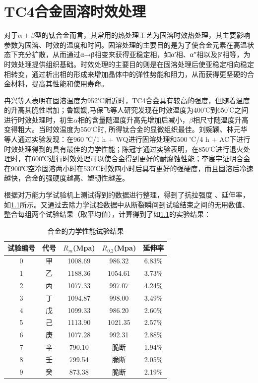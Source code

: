 \chapter{TC4合金固溶时效处理}

对于$\alpha+\beta$型的\ti 钛合金而言，其常用的热处理工艺为固溶时效热处理，其主要影响参数为固溶、时效的温度和时间\cite{mirror1,ranxingGurongwenduduiTi6Al4VELItaihejinxianweizuzhijixingnengdeyingxiang2021}。固溶处理的主要目的是为了使合金元素在高温状态下充分扩散，从而通过α→β相变来获得亚稳定相，如α′相、α′′相以及β′相等，为时效处理提供组织基础。时效处理的主要目的则是在固溶处理后使亚稳定相向稳定相转变，通过析出相的形成来增加晶体中的弹性势能和阻力，从而获得更坚硬的合金材料，提高其性能和使用寿命。


冉兴等人表明\cite{ranxingGurongwenduduiTi6Al4VELItaihejinxianweizuzhijixingnengdeyingxiang2021}在固溶温度为952℃附近时，TC4合金具有较高的强度，但随着温度的升高其脆性增加；鲁媛媛,马保飞等人研究发现在时效温度为400℃到650℃之间进行时效处理时，初生$ \alpha $相的含量随温度升高先增加后减小，$\beta$相尺寸随温度升高变得粗大。当时效温度为550℃时, 所得钛合金的显微组织最佳\cite{luyuanyuanShixiaochuliduiTC4taihejinweiguanzuzhihelixuexingnengdeyingxiang2019}。刘婉颖、林元华等人通过实验发现：在960 ℃/1 h + WQ进行固溶处理和500 ℃/4 h + AC下进行时效处理得到的\ti 具有最佳的力学性能\cite{LiuWanYingBuTongReChuLiGongYiDuiTi6Al4VTaiHeJinWeiGuanJieGouHeLiXueXingNengYingXiangYingWen2017}；陈冠宇通过实验表明，在850℃进行退火处理时，在600℃进行时效处理可以使合金得到更好的耐腐蚀性能\cite{1200}；李宸宇证明\ti 合金在900℃空冷固溶两小时在530℃时效四小时后具有更好的强硬度，而且固溶后冷速越快，合金的强硬度越高、塑韧性越差\cite{900}。%

根据对万能力学试验机上测试得到的数据进行整理，得到了抗拉强度%
、延伸率，如\ref{sec:mystrength}所示。又通过去除力学试验数据中从断裂瞬间到试验结束之间的无用数值、整合每组两个试验结果（取平均值），计算得到了如\ref{sec:mystrength}的实验结果：
\begin{table}[htbp]
	\centering
	\caption{\ti 合金的力学性能试验结果}
	\label{sec:mystrength}
	\begin{tabular}{ccccc}
		\toprule
		试验编号& 代号&$ R_m $(Mpa)&$ R_0.2 $(Mpa)&延伸率 \\
		\midrule
		0 & 甲 & 1008.69 &986.32& 6.83$\%$ \\
		1 & 乙 & 1188.36 &1054.61 &3.73$\%$ \\
		2 & 丙 & 1077.33 & 997.07&4.24$\%$ \\
		3 & 丁 & 1094.87 & 998.00&3.49$\%$ \\
		4 & 戊 & 1099.33 &986.20 &2.60$\%$ \\
		5 & 己 & 1113.90 & 1021.35&2.57$\%$ \\
		6 & 庚 & 1077.28 &992.31& 2.88$\%$ \\
		7 & 辛 & 790.10 & 脆断&1.94$\%$ \\
		8 & 壬 & 799.54 &脆断& 2.05$\%$ \\
		9 & 癸 & 873.38 & 脆断&2.19$\%$ \\
		\bottomrule
	\end{tabular}
\end{table}

